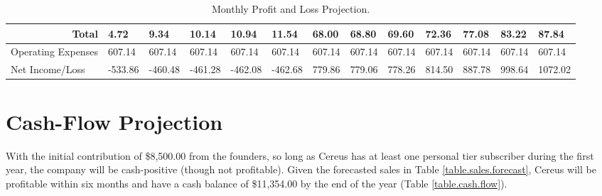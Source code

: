 \begin{sidewaystable}
\begin{table}[H]
\begin{tabularx}{\textwidth}{X X X X X X X X X X X X X}
    \multicolumn{1}{r}{Total} & 4.72 & 9.34 & 10.14 & 10.94 & 11.54 & 68.00 & 68.80 & 69.60 & 72.36 & 77.08 & 83.22 & 87.84  \\

    \hline

    \multicolumn{1}{l}{Operating Expenses} & 607.14 & 607.14 & 607.14 & 607.14 & 607.14 & 607.14 & 607.14 & 607.14 & 607.14 & 607.14 & 607.14 & 607.14  \\

    \multicolumn{1}{l}{Net Income/Loss} & -533.86 & -460.48 & -461.28 & -462.08 & -462.68 & 779.86 & 779.06 & 778.26 & 814.50 & 887.78 & 998.64 & 1072.02  \\

  \end{tabularx}
  \caption{Monthly Profit and Loss Projection.}
  \label{table.profit.loss}
\end{table}
\end{sidewaystable}


\section{Cash-Flow Projection}

With the initial contribution of \$8,500.00 from the founders, so long as Cereus has at least one personal tier subscriber during the first year, the company will be cash-positive (though not profitable). Given the forecasted sales in Table \ref{table.sales.forecast}, Cereus will be profitable within six months and have a cash balance of \$11,354.00 by the end of the year (Table \ref{table.cash.flow}).


